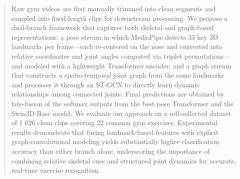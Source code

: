 \documentclass[journal,onecolumn, 11pt]{IEEEtran}
\begin{document}
\begin{abstract}

Raw gym videos are first manually trimmed into clean segments and sampled into fixed‐length clips for downstream processing. We propose a dual‐branch framework that captures both skeletal and graph‐based representations: a pose stream in which MediaPipe detects 33 key 3D landmarks per frame—each re‐centered on the nose and converted into relative coordinates and joint angles computed via triplet permutations—and modeled with a lightweight Transformer encoder; and a graph stream that constructs a spatio‐temporal joint graph from the same landmarks and processes it through an ST‐GCN to directly learn dynamic relationships among connected joints. Final predictions are obtained by late-fusion of the softmax outputs from the best pose Transformer and the Swin3D-Base model. We evaluate our approach on a self‐collected dataset of 1 026 clean clips covering 22 common gym exercises. Experimental results demonstrate that fusing landmark‐based features with explicit graph‐convolutional modeling yields substantially higher classification accuracy than either branch alone, underscoring the importance of combining relative skeletal cues and structured joint dynamics for accurate, real‐time exercise recognition.

\end{abstract}
\end{document}
